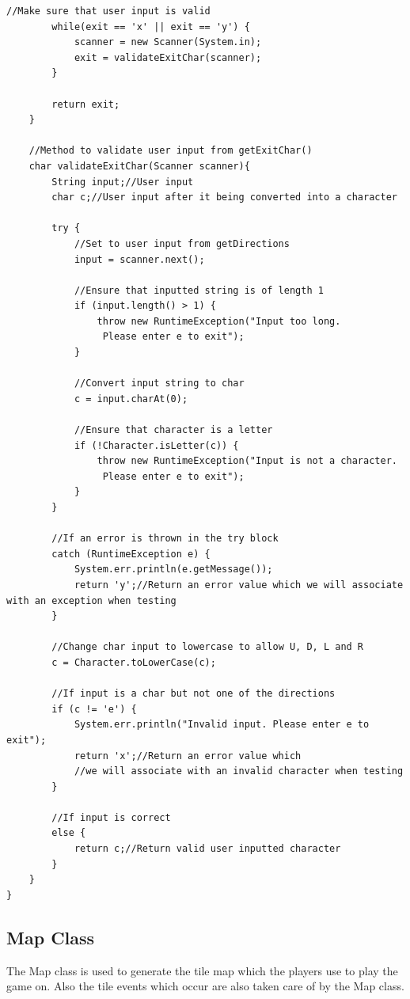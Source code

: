 \documentclass[a4paper,12pt]{extarticle}
\begin{document}
\begin{lstlisting}[caption=The initial code of the Game class, label=amb]
        //Make sure that user input is valid
        while(exit == 'x' || exit == 'y') {
            scanner = new Scanner(System.in);
            exit = validateExitChar(scanner);
        }

        return exit;
    }

    //Method to validate user input from getExitChar()
    char validateExitChar(Scanner scanner){
        String input;//User input
        char c;//User input after it being converted into a character

        try {
            //Set to user input from getDirections
            input = scanner.next();

            //Ensure that inputted string is of length 1
            if (input.length() > 1) {
                throw new RuntimeException("Input too long.
                 Please enter e to exit");
            }

            //Convert input string to char
            c = input.charAt(0);

            //Ensure that character is a letter
            if (!Character.isLetter(c)) {
                throw new RuntimeException("Input is not a character.
                 Please enter e to exit");
            }
        }

        //If an error is thrown in the try block
        catch (RuntimeException e) {
            System.err.println(e.getMessage());
            return 'y';//Return an error value which we will associate with an exception when testing
        }

        //Change char input to lowercase to allow U, D, L and R
        c = Character.toLowerCase(c);

        //If input is a char but not one of the directions
        if (c != 'e') {
            System.err.println("Invalid input. Please enter e to exit");
            return 'x';//Return an error value which 
            //we will associate with an invalid character when testing
        }

        //If input is correct
        else {
            return c;//Return valid user inputted character
        }
    }
}
\end{lstlisting}

\subsection{Map Class}
The Map class is used to generate the tile map which the players use to play the game on. Also the tile events which occur are also taken care of by the Map class.
\end{document}
